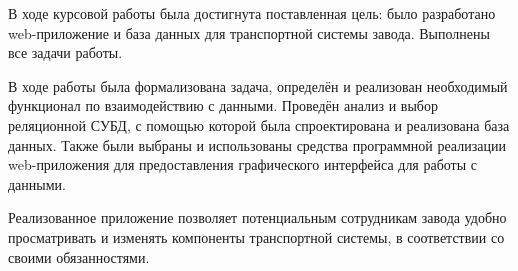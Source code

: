 В ходе курсовой работы была достигнута поставленная цель: было разработано web-приложение и база данных для транспортной системы завода. Выполнены все задачи работы.

В ходе работы была формализована задача, определён и реализован необходимый функционал по взаимодействию с данными. Проведён анализ и выбор реляционной СУБД, с помощью которой была спроектирована и реализована база данных. Также были выбраны и использованы средства программной реализации web-приложения для предоставления графического интерфейса для работы с данными.

Реализованное приложение позволяет потенциальным сотрудникам завода удобно просматривать и изменять компоненты транспортной системы, в соответствии со своими обязанностями.
